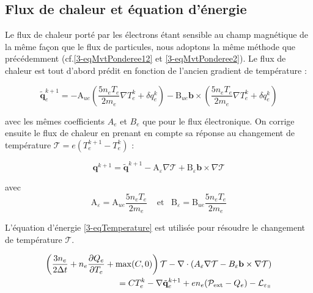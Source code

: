 \begin{refsection}
\subsection{Flux de chaleur et équation d'énergie}

Le flux de chaleur porté par les électrons étant sensible au champ magnétique de
la même façon que le flux de particules, nous adoptons la même méthode que
précédemment (cf.\eqref{3-eqMvtPonderee12} et \eqref{3-eqMvtPonderee2}). Le flux de chaleur est tout d'abord
prédit en fonction de l'ancien gradient de température :

\begin{equation}
\label{3-eqChaleurPonderee}
\tilde{\mathbf{q}}_e^{k+1}=-\text{A}_{ue}(
\frac{5n_eT_e}{2m_e}\nabla T_e^k+\delta q_e^k)-\text{B}_{ue}\mathbf
b\times(\frac{5n_eT_e}{2m_e}\nabla T_e^k +\delta q_e^k)
\end{equation}

avec les mêmes coefficients $A_e$ et $B_e$ que pour le flux électronique. On
corrige ensuite le flux de chaleur en prenant en compte sa réponse au changement
de température $\mathcal T=e(T_e^{k+1}-T_e^k)$ :

\begin{equation}
\label{3-eqCorrectionVitesse}
\mathbf q^{k+1} = \tilde{\mathbf q}^{k+1}-\text{A}_\varepsilon\nabla
\mathcal T+\text{B}_\varepsilon\mathbf b\times\nabla
\mathcal T
\end{equation}

avec 
\begin{equation*}
\label{3-coefficientsChaleur}
\text{A}_\varepsilon=\text{A}_{ue}\frac{5n_eT_e}{2m_e}\;\;\;\;\text{et}\;\;\;\text{B}_\varepsilon=\text{B}_{ue}\frac{5n_eT_e}{2m_e}
\end{equation*}

L'équation d'énergie \eqref{3-eqTemperature} est utilisée pour résoudre le
changement de température $\mathcal T$. 

\begin{equation}
\label{3-eqTemperature2}
\begin{split}
\left(\frac{3n_e}{2\Delta
t}+n_e\frac{\partial Q_e}{\partial T_e}+\max(C,0)\right)\mathcal T
-\nabla\cdot\left(A_\varepsilon\nabla\mathcal T- B_\varepsilon\mathbf
b\times\nabla\mathcal T\right)\\ =  C T_e^k -\nabla\tilde{\mathbf q}_e^{k+1}+
en_e(\mathcal{P}_\text{ext}-Q_e)-\mathcal L_{\varepsilon_\para}
\end{split}\end{equation}


\end{refsection}
